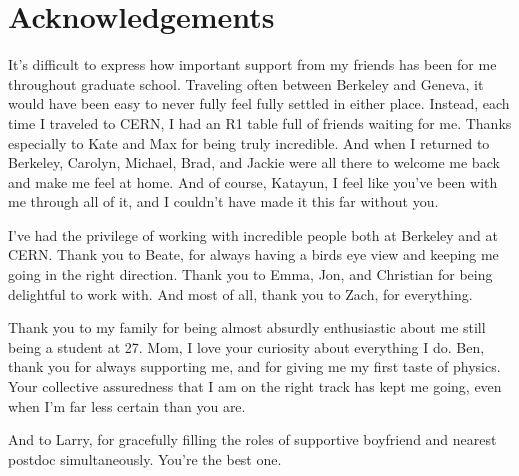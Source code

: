 



\bigskip


\begingroup

\let\clearpage\relax
\let\cleardoublepage\relax
\let\cleardoublepage\relax

\chapter*{Acknowledgements}

\noindent 

It's difficult to express how important support from my friends has been for me throughout graduate school. Traveling often between Berkeley and Geneva, it would have been easy to never fully feel fully settled in either place. Instead, each time I traveled to CERN, I had an R1 table full of friends waiting for me. Thanks especially to Kate and Max for being truly incredible. And when I returned to Berkeley, Carolyn, Michael, Brad, and Jackie were all there to welcome me back and make me feel at home. And of course, Katayun, I feel like you've been with me through all of it, and I couldn't have made it this far without you.

I've had the privilege of working with incredible people both at Berkeley and at CERN. Thank you to Beate, for always having a birds eye view and keeping me going in the right direction. Thank you to Emma, Jon, and Christian for being delightful to work with. And most of all, thank you to Zach, for everything.

Thank you to my family for being almost absurdly enthusiastic about me still being a student at 27. Mom, I love your curiosity about everything I do. Ben, thank you for always supporting me, and for giving me my first taste of physics. Your collective assuredness that I am on the right track has kept me going, even when I'm far less certain than you are. 

And to Larry, for gracefully filling the roles of supportive boyfriend and nearest postdoc simultaneously. You're the best one.


\endgroup